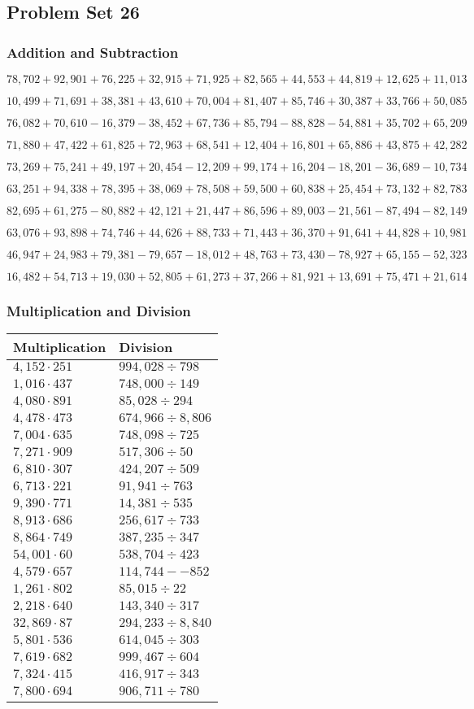 \hypertarget{problem-set-26-4}{%
\subsection{Problem Set 26}\label{problem-set-26-4}}

\hypertarget{addition-and-subtraction-248}{%
\subsubsection{Addition and
Subtraction}\label{addition-and-subtraction-248}}

\(78,702+92,901+76,225+32,915+71,925+82,565+44,553+44,819+12,625+ 11,013\)

\(10,499+71,691+38,381+43,610+70,004+81,407+85,746+30,387+33,766+50,085\)

\(76,082+70,610-16,379-38,452+67,736+85,794-88,828-54,881+35,702+65,209\)

\(71,880+47,422+61,825+72,963+68,541+12,404+16,801+65,886+43,875+42,282\)

\(73,269+75,241+49,197+20,454-12,209+99,174+16,204-18,201-36,689-10,734\)

\(63,251+94,338+78,395+38,069+78,508+59,500+60,838+25,454+73,132+82,783\)

\(82,695+61,275-80,882+42,121+21,447+86,596+89,003-21,561-87,494-82,149\)

\(63,076+93,898+74,746+44,626+88,733+71,443+36,370+91,641+44,828+10,981\)

\(46,947+24,983+79,381-79,657-18,012+48,763+73,430-78,927+65,155-52,323\)

\(16,482+54,713+19,030+52,805+61,273+37,266+81,921+13,691+75,471+21,614\)

\hypertarget{multiplication-and-division-247}{%
\subsubsection{Multiplication and
Division}\label{multiplication-and-division-247}}

\begin{longtable}[]{@{}ll@{}}
\toprule
Multiplication & Division\tabularnewline
\midrule
\endhead
\(4,152\cdot251\) & \(994,028÷798\)\tabularnewline
\(1,016\cdot437\) & \(748,000÷149\)\tabularnewline
\(4,080\cdot891\) & \(85,028÷294\)\tabularnewline
\(4,478\cdot473\) & \(674,966÷8,806\)\tabularnewline
\(7,004\cdot635\) & \(748,098÷725\)\tabularnewline
\(7,271\cdot909\) & \(517,306 ÷50\)\tabularnewline
\(6,810\cdot307\) & \(424,207÷509\)\tabularnewline
\(6,713\cdot221\) & \(91,941÷763\)\tabularnewline
\(9,390\cdot771\) & \(14,381÷535\)\tabularnewline
\(8,913\cdot686\) & \(256,617÷733\)\tabularnewline
\(8,864\cdot749\) & \(387,235÷347\)\tabularnewline
\(54,001\cdot60\) & \(538,704÷423\)\tabularnewline
\(4,579\cdot657\) & \(114,744 -- 852\)\tabularnewline
\(1,261\cdot802\) & \(85,015÷22\)\tabularnewline
\(2,218\cdot640\) & \(143,340÷317\)\tabularnewline
\(32,869\cdot87\) & \(294,233÷8,840\)\tabularnewline
\(5,801\cdot536\) & \(614,045÷303\)\tabularnewline
\(7,619\cdot682\) & \(999,467÷604\)\tabularnewline
\(7,324\cdot415\) & \(416,917÷343\)\tabularnewline
\(7,800\cdot694\) & \(906,711÷780\)\tabularnewline
\bottomrule
\end{longtable}

